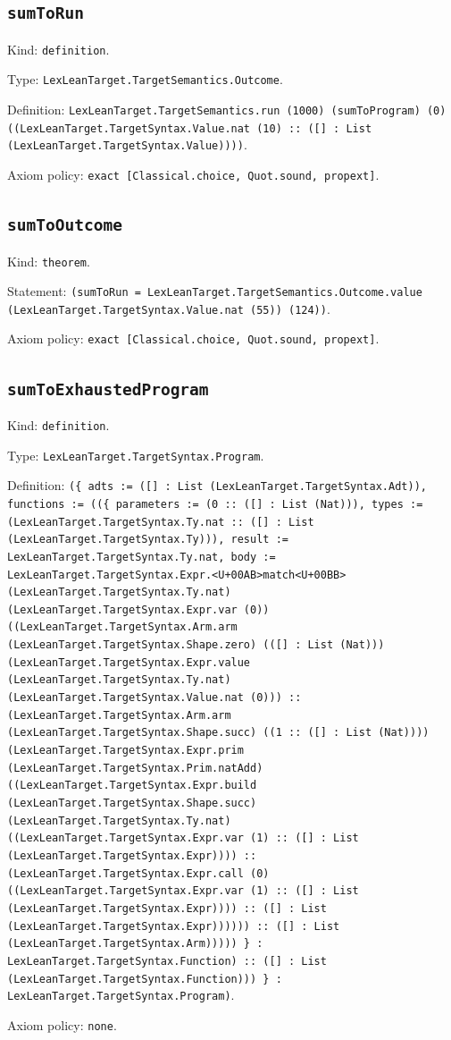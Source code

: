 \documentclass[11pt]{article}
\begin{document}
\subsection*{\texttt{sumToRun}}
\noindent Kind: \texttt{definition}.\par
\noindent Type: \texttt{LexLeanTarget.TargetSemantics.Outcome}.\par
\noindent Definition: \texttt{LexLeanTarget.TargetSemantics.run (1000) (sumToProgram) (0) ((LexLeanTarget.TargetSyntax.Value.nat (10) :: ([] : List (LexLeanTarget.TargetSyntax.Value))))}.\par
\noindent Axiom policy: \texttt{exact [Classical.choice, Quot.sound, propext]}.\par
\subsection*{\texttt{sumToOutcome}}
\noindent Kind: \texttt{theorem}.\par
\noindent Statement: \texttt{(sumToRun = LexLeanTarget.TargetSemantics.Outcome.value (LexLeanTarget.TargetSyntax.Value.nat (55)) (124))}.\par
\noindent Axiom policy: \texttt{exact [Classical.choice, Quot.sound, propext]}.\par
\subsection*{\texttt{sumToExhaustedProgram}}
\noindent Kind: \texttt{definition}.\par
\noindent Type: \texttt{LexLeanTarget.TargetSyntax.Program}.\par
\noindent Definition: \texttt{(\{ adts := ([] : List (LexLeanTarget.TargetSyntax.Adt)), functions := ((\{ parameters := (0 :: ([] : List (Nat))), types := (LexLeanTarget.TargetSyntax.Ty.nat :: ([] : List (LexLeanTarget.TargetSyntax.Ty))), result := LexLeanTarget.TargetSyntax.Ty.nat, body := LexLeanTarget.TargetSyntax.Expr.<U+00AB>match<U+00BB> (LexLeanTarget.TargetSyntax.Ty.nat) (LexLeanTarget.TargetSyntax.Expr.var (0)) ((LexLeanTarget.TargetSyntax.Arm.arm (LexLeanTarget.TargetSyntax.Shape.zero) (([] : List (Nat))) (LexLeanTarget.TargetSyntax.Expr.value (LexLeanTarget.TargetSyntax.Ty.nat) (LexLeanTarget.TargetSyntax.Value.nat (0))) :: (LexLeanTarget.TargetSyntax.Arm.arm (LexLeanTarget.TargetSyntax.Shape.succ) ((1 :: ([] : List (Nat)))) (LexLeanTarget.TargetSyntax.Expr.prim (LexLeanTarget.TargetSyntax.Prim.natAdd) ((LexLeanTarget.TargetSyntax.Expr.build (LexLeanTarget.TargetSyntax.Shape.succ) (LexLeanTarget.TargetSyntax.Ty.nat) ((LexLeanTarget.TargetSyntax.Expr.var (1) :: ([] : List (LexLeanTarget.TargetSyntax.Expr)))) :: (LexLeanTarget.TargetSyntax.Expr.call (0) ((LexLeanTarget.TargetSyntax.Expr.var (1) :: ([] : List (LexLeanTarget.TargetSyntax.Expr)))) :: ([] : List (LexLeanTarget.TargetSyntax.Expr)))))) :: ([] : List (LexLeanTarget.TargetSyntax.Arm))))) \} : LexLeanTarget.TargetSyntax.Function) :: ([] : List (LexLeanTarget.TargetSyntax.Function))) \} : LexLeanTarget.TargetSyntax.Program)}.\par
\noindent Axiom policy: \texttt{none}.\par
\end{document}
